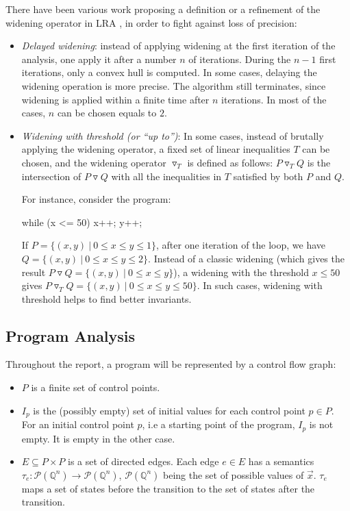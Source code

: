 \documentclass[a4paper,english,titlepage,11pt]{report}
\def\Q{\mathbb{Q}}
\def\P{\mathcal{P}}
\newcommand{\widening}{\mathop{\triangledown}}
\begin{document}
There have been various
work proposing a definition or a refinement of the widening operator in LRA
\cite{CH78,Hal79,HPR97,BlanchetCousotEtAl_PLDI03}, in order to fight
against loss of precision:
\begin{itemize}
\item \emph{Delayed widening}: instead of applying widening at the first
iteration of the analysis, one apply it after a number $n$ of iterations. During
the $n-1$ first iterations, only a convex hull is computed. In some cases,
delaying the widening operation is more precise. The algorithm still terminates,
since widening is applied within a finite time after $n$ iterations. In most of
the cases, $n$ can be chosen equals to $2$.
\item \emph{Widening with threshold (or ``up to'')}: In some cases, instead of
brutally applying the widening operator, a fixed set of linear inequalities $T$
can be chosen, and the widening operator $\widening_T$ is defined as follows:
$P \widening_T Q$ is the intersection of $P \widening Q$ with all the inequalities in
$T$ satisfied by both $P$ and $Q$.

For instance, consider the program:
\begin{C}
while (x <= 50) {
	x++;
	y++;
}
\end{C}
If $P = \{(x,y)\ |\ 0 \leq x \leq y \leq 1 \}$, after one iteration of the loop,
we have $Q = \{(x,y)\ |\ 0 \leq x \leq y \leq 2 \}$. Instead of a classic
widening (which gives the result $P \widening Q = \{(x,y)\ |\ 0 \leq x \leq y \}$),
a widening with the threshold $x \leq 50$ gives 
$P \widening_T Q = \{(x,y)\ |\ 0 \leq x \leq y \leq 50\}$. In such cases, widening
with threshold helps to find better invariants.
\end{itemize}

\subsection{Program Analysis}

Throughout the report, a program will be represented by a control flow graph:
\begin{itemize}
\item $P$ is a finite set of control points.
\item $I_p$ is the (possibly empty)
set of initial values for each control point $p \in P$. For an initial control
point $p$, i.e a starting point of the program, $I_p$ is not empty. It is empty
in the other case.
\item $E \subseteq  P \times P$ is a set of directed edges. Each edge $e \in E$
has a semantics $\tau_e: \P(\Q^n) \rightarrow \P(\Q^n)$, $\P(\Q^n)$ being the
set
of possible values of $\overrightarrow{x}$. $\tau_e$ maps a set of states before
the transition to the set of states after the transition.
\end{itemize}
\end{document}

